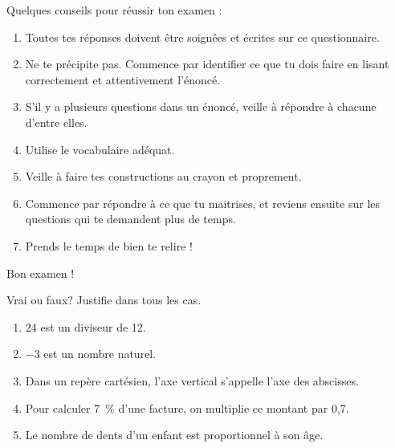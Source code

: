 \documentclass[parskip=half-,DIV=12,twoside=semi, 12pt]{scrartcl}
\newcounter{l}
\begin{document}
\medbreak
Quelques conseils pour réussir ton examen :
\begin{enumerate}[itemsep=0.5cm, label=$\bullet$]
    \item Toutes tes réponses doivent être soignées et écrites sur ce questionnaire.
    \item Ne te précipite pas. Commence par identifier ce que tu dois faire en lisant correctement et attentivement l'énoncé.
    \item S'il y a plusieurs questions dans un énoncé, veille à répondre à chacune d'entre elles.
    \item Utilise le vocabulaire adéquat.
    \item Veille à faire tes constructions au crayon et proprement.
    \item Commence par répondre à ce que tu maitrises, et reviens ensuite sur les questions qui te demandent plus de temps.
    \item Prends le temps de bien te relire !
\end{enumerate}
\vfill
\begin{flushright}
    Bon examen !
\end{flushright}
\cleardoublepage
\setcounter{page}{1}
\pagestyle{plain}
\begin{connaitre}[points=5]
    Vrai ou faux? Justifie dans tous les cas.
    \begin{enumerate}
        \item 24 est un diviseur de 12.
        \item \(-3\) est un nombre naturel.
        \item Dans un repère cartésien, l'axe vertical s'appelle l'axe des abscisses.
        \item Pour calculer \SI{7}{\%} d'une facture, on multiplie ce montant par 0,7.
        \item Le nombre de dents d'un enfant est proportionnel à son âge.
    \end{enumerate}
\end{connaitre}
\end{document}
